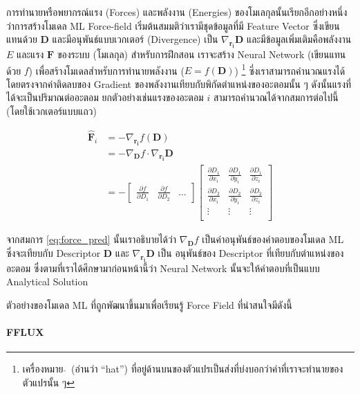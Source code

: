 การทำนายหรือพยากรณ์แรง (Forces) และพลังงาน (Energies) ของโมเลกุลนั้นเรียกอีกอย่างหนึ่งว่าการสร้างโมเดล ML Force-field 
เริ่มต้นสมมติว่าเรามีชุดข้อมูลที่มี Feature Vector ซึ่งเขียนแทนด้วย $\mathbf{D}$ และมีอนุพันธ์แบบเวกเตอร์ (Divergence) เป็น 
$\nabla_{\mathbf{r_i}} \mathbf{D}$ และมีข้อมูลเพิ่มเติมคือพลังงาน $E$ และแรง $\mathbf{F}$ ของระบบ (โมเลกุล) สำหรับการฝึกสอน
เราจะสร้าง Neural Network (เขียนแทนด้วย $f$) เพื่อสร้างโมเดลสำหรับการทำนายพลังงาน ($\hat{E} = f(\mathbf{D})$)
\footnote{เครื่องหมาย $\hat{}$\, (อ่านว่า \enquote{hat}) ที่อยู่ด้านบนของตัวแปรเป็นส่งที่บ่งบอกว่าค่าที่เราจะทำนายของตัวแปรนั้น ๆ}
ซึ่งเราสามารถคำนวณแรงได้โดยตรงจากค่าติดลบของ Gradient ของพลังงานเทียบกับพิกัดตำแหน่งของอะตอมนั้น ๆ ดังนั้นแรงที่ได้จะเป็นปริมาณต่ออะตอม
ยกตัวอย่างเช่นแรงของอะตอม $i$ สามารถคำนวณได้จากสมการต่อไปนี้ (โดยใช้เวกเตอร์แบบแถว)

\begin{align}\label{eq:force_pred}
\hat{\mathbf{F}}_i &= - \nabla_{\mathbf{r_i}} f(\mathbf{D}) \\
&= - \nabla_{\mathbf{D}} f \cdot \nabla_{\mathbf{r_i}} \mathbf{D}\\
&= - \begin{bmatrix}
    \frac{\partial f}{\partial D_1} & \frac{\partial f}{\partial D_2} & \dots
\end{bmatrix}
\begin{bmatrix}
    \frac{\partial D_1}{\partial x_i} & \frac{\partial D_1}{\partial y_i} & \frac{\partial D_1}{\partial z_i}\\
    \frac{\partial D_2}{\partial x_i} & \frac{\partial D_2}{\partial y_i} & \frac{\partial D_2}{\partial z_i}\\
    \vdots & \vdots & \vdots \\
\end{bmatrix}
\end{align}

จากสมการ \ref{eq:force_pred} นั้นเราอธิบายได้ว่า $\nabla_{\mathbf{D}} f$ เป็นค่าอนุพันธ์ของคำตอบของโมเดล ML ซึ่งจะเทียบกับ
Descriptor $\mathbf{D}$ และ $\nabla_{\mathbf{r_i}} \mathbf{D}$ เป็น อนุพันธ์ของ Descriptor ที่เทียบกับตำแหน่งของอะตอม
ซึ่งตามที่เราได้ศึกษามาก่อนหน้านี้ว่า Neural Network นั้นจะให้คำตอบที่เป็นแบบ Analytical Solution

ตัวอย่างของโมเดล ML ที่ถูกพัฒนาขึ้นมาเพื่อเรียนรู้ Force Field ที่น่าสนใจมีดังนี้

\paragraph{FFLUX}\autocite{hughes2019}

